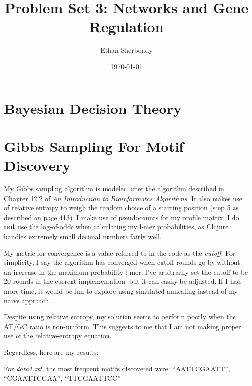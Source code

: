 \documentclass{article}
\author{Ethan Sherbondy}
\date{\today}
\title{Problem Set 3: Networks and Gene Regulation}
\begin{document}
  
\maketitle  
\section{Bayesian Decision Theory}  

\section{Gibbs Sampling For Motif Discovery}

My Gibbs sampling algorithm is modeled after the algorithm
described in Chapter 12.2 of \textit{An Introduction to Bioinformatcs Algorithms}. It also makes use of relative entropy to weigh the random choice of a starting position (step 5 as described on page 413). I make use of pseudocounts for my profile matrix. I do \textbf{not} use the log-of-odds when calculating my l-mer probabilities, as Clojure handles extremely small decimal numbers fairly well.

My metric for convergence is a value referred to in the code as the \textit{cutoff}. For simplicity, I say the algorithm has converged when cutoff rounds go by without an increase in the maximum-probability l-mer. I've arbitrarily set the cutoff to be 20 rounds in the current implementation, but it can easily be adjusted. If I had more time, it would be fun to explore using simulated annealing instead of my naive approach.

Despite using relative entropy, my solution seems to perform poorly when the AT/GC ratio is non-uniform. This suggests to me that I am not making proper use of the relative-entropy equation.

Regardless, here are my results:

For \textit{data1.txt}, the most frequent motifs discovered were:
``AATTCGAATT'', ``CGAATTCGAA'', ``TTCGAATTCC''
\end{document}
